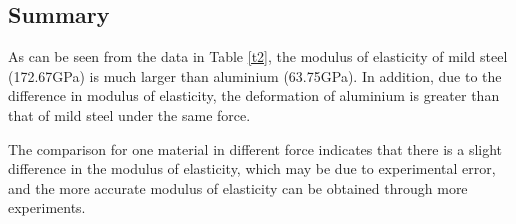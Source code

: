 \subsection*{Summary}

As can be seen from the data in Table \ref{t2}, 
the modulus of elasticity of mild steel (172.67GPa) is much larger than aluminium (63.75GPa).
In addition, due to the difference in modulus of elasticity, the deformation of aluminium is 
greater than that of mild steel under the same force.

The comparison for one material in different force indicates that there is a slight difference 
in the modulus of elasticity, 
which may be due to experimental error, and the more accurate 
modulus of elasticity can be obtained through more 
experiments.
